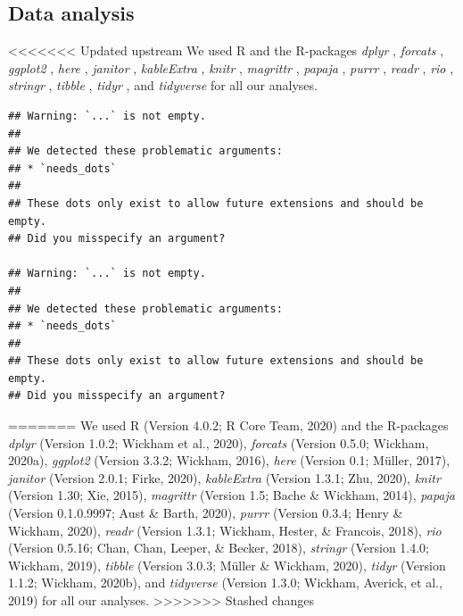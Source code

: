 \documentclass[
  english,
  man]{apa6}
\begin{document}
\hypertarget{data-analysis}{%
\subsection{Data analysis}\label{data-analysis}}

<<<<<<< Updated upstream
We used R \autocite[Version 3.6.1;][]{R-base} and the R-packages \emph{dplyr} \autocite[Version 1.0.0;][]{R-dplyr}, \emph{forcats} \autocite[Version 0.5.0;][]{R-forcats}, \emph{ggplot2} \autocite[Version 3.3.2;][]{R-ggplot2}, \emph{here} \autocite[Version 0.1;][]{R-here}, \emph{janitor} \autocite[Version 2.0.1;][]{R-janitor}, \emph{kableExtra} \autocite[Version 1.3.1;][]{R-kableExtra}, \emph{knitr} \autocite[Version 1.29;][]{R-knitr}, \emph{magrittr} \autocite[Version 1.5;][]{R-magrittr}, \emph{papaja} \autocite[Version 0.1.0.9997;][]{R-papaja}, \emph{purrr} \autocite[Version 0.3.4;][]{R-purrr}, \emph{readr} \autocite[Version 1.3.1;][]{R-readr}, \emph{rio} \autocite[Version 0.5.16;][]{R-rio}, \emph{stringr} \autocite[Version 1.4.0;][]{R-stringr}, \emph{tibble} \autocite[Version 3.0.2;][]{R-tibble}, \emph{tidyr} \autocite[Version 1.1.0;][]{R-tidyr}, and \emph{tidyverse} \autocite[Version 1.3.0;][]{R-tidyverse} for all our analyses.

\begin{verbatim}
## Warning: `...` is not empty.
## 
## We detected these problematic arguments:
## * `needs_dots`
## 
## These dots only exist to allow future extensions and should be empty.
## Did you misspecify an argument?

## Warning: `...` is not empty.
## 
## We detected these problematic arguments:
## * `needs_dots`
## 
## These dots only exist to allow future extensions and should be empty.
## Did you misspecify an argument?
\end{verbatim}
=======
We used R (Version 4.0.2; R Core Team, 2020) and the R-packages \emph{dplyr} (Version 1.0.2; Wickham et al., 2020), \emph{forcats} (Version 0.5.0; Wickham, 2020a), \emph{ggplot2} (Version 3.3.2; Wickham, 2016), \emph{here} (Version 0.1; Müller, 2017), \emph{janitor} (Version 2.0.1; Firke, 2020), \emph{kableExtra} (Version 1.3.1; Zhu, 2020), \emph{knitr} (Version 1.30; Xie, 2015), \emph{magrittr} (Version 1.5; Bache \& Wickham, 2014), \emph{papaja} (Version 0.1.0.9997; Aust \& Barth, 2020), \emph{purrr} (Version 0.3.4; Henry \& Wickham, 2020), \emph{readr} (Version 1.3.1; Wickham, Hester, \& Francois, 2018), \emph{rio} (Version 0.5.16; Chan, Chan, Leeper, \& Becker, 2018), \emph{stringr} (Version 1.4.0; Wickham, 2019), \emph{tibble} (Version 3.0.3; Müller \& Wickham, 2020), \emph{tidyr} (Version 1.1.2; Wickham, 2020b), and \emph{tidyverse} (Version 1.3.0; Wickham, Averick, et al., 2019) for all our analyses.
>>>>>>> Stashed changes
\end{document}
